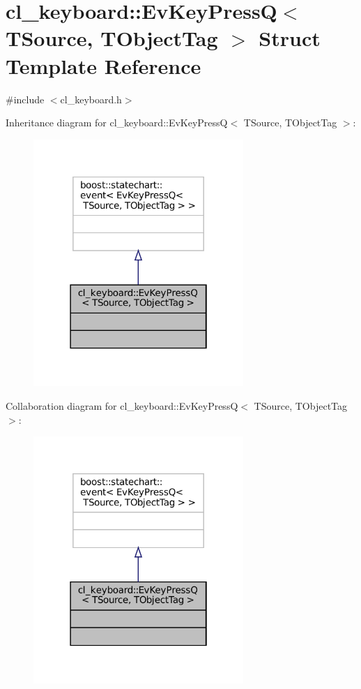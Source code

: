 \hypertarget{structcl__keyboard_1_1EvKeyPressQ}{}\section{cl\+\_\+keyboard\+:\+:Ev\+Key\+PressQ$<$ T\+Source, T\+Object\+Tag $>$ Struct Template Reference}
\label{structcl__keyboard_1_1EvKeyPressQ}


{\ttfamily \#include $<$cl\+\_\+keyboard.\+h$>$}



Inheritance diagram for cl\+\_\+keyboard\+:\+:Ev\+Key\+PressQ$<$ T\+Source, T\+Object\+Tag $>$\+:
\nopagebreak
\begin{figure}[H]
\begin{center}
\leavevmode
\includegraphics[width=226pt]{structcl__keyboard_1_1EvKeyPressQ__inherit__graph}
\end{center}
\end{figure}


Collaboration diagram for cl\+\_\+keyboard\+:\+:Ev\+Key\+PressQ$<$ T\+Source, T\+Object\+Tag $>$\+:
\nopagebreak
\begin{figure}[H]
\begin{center}
\leavevmode
\includegraphics[width=226pt]{structcl__keyboard_1_1EvKeyPressQ__coll__graph}
\end{center}
\end{figure}


